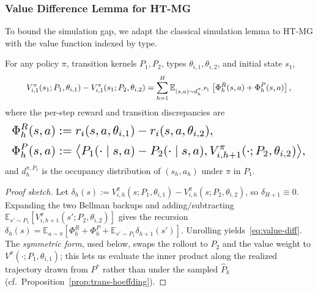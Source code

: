 \subsubsection{Value Difference Lemma for HT-MG}

To bound the simulation gap, we adapt the classical simulation lemma \citep{kearns2002near,bai2020provable} to HT-MG with the value function indexed by type.

\begin{lemma}
\label{lem:value-diff}
For any policy $\pi$, transition kernels $P_1, P_2$, types $\theta_{i,1}, \theta_{i,2}$, and initial state $s_1$,
\begin{equation}\label{eq:value-diff}\resizebox{0.9\linewidth}{!}{$\displaystyle V_{i,1}^{\pi}(s_1; P_1, \theta_{i,1}) - V_{i,1}^{\pi}(s_1; P_2, \theta_{i,2}) = \sum_{h=1}^{H} \mathbb{E}_{(s,a) \sim d_h^{\pi, P_1}}\left[\Phi_h^R(s,a) + \Phi_h^P(s,a)\right], $}\end{equation}
where the per-step reward and transition discrepancies are
\begin{equation*}
\resizebox{\linewidth}{!}{$\displaystyle\begin{aligned}
\Phi_h^R(s,a) &:= r_i(s, a, \theta_{i,1}) - r_i(s, a, \theta_{i,2}), \\
\Phi_h^P(s,a) &:= \big\langle P_1(\cdot \mid s, a) - P_2(\cdot \mid s, a), V_{i,h+1}^{\pi}(\cdot; P_2, \theta_{i,2})\big\rangle,
\end{aligned}$}
\end{equation*}
and $d_h^{\pi, P_1}$ is the occupancy distribution of $(s_h, a_h)$ under $\pi$ in $P_1$.
\end{lemma}

\begin{proof}[Proof sketch]
Let $\delta_h(s) := V_{i,h}^\pi(s; P_1, \theta_{i,1}) - V_{i,h}^\pi(s; P_2, \theta_{i,2})$, so $\delta_{H+1}\equiv 0$. Expanding the two Bellman backups and adding/subtracting $\mathbb{E}_{s'\sim P_1}[V_{i,h+1}^\pi(s'; P_2, \theta_{i,2})]$ gives the recursion $\delta_h(s) = \mathbb{E}_{a\sim\pi}[\Phi_h^R + \Phi_h^P + \mathbb{E}_{s'\sim P_1}\delta_{h+1}(s')]$. Unrolling yields~\eqref{eq:value-diff}. The \emph{symmetric form}, used below, swaps the rollout to $P_2$ and the value weight to $V^\pi(\cdot;P_1,\theta_{i,1})$; this lets us evaluate the inner product along the realized trajectory drawn from $P^*$ rather than under the sampled $\hat P_k$ (cf.\ Proposition~\ref{prop:trans-hoeffding}).
\end{proof}

